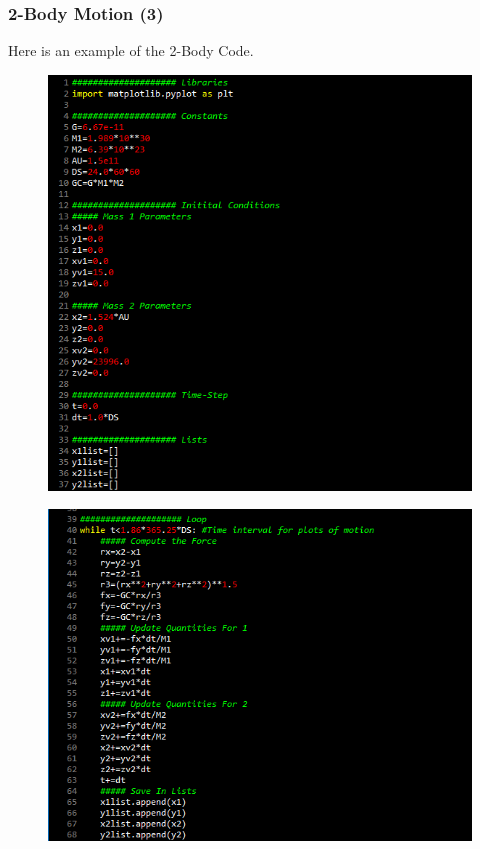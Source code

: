\documentclass{beamer}
\begin{document}
\begin{frame}
\frametitle{2-Body Motion (3)}
Here is an example of the 2-Body Code.
\begin{multicols}{2}
\begin{figure}
\begin{center}
\includegraphics[width=1.0\linewidth]{2BodyCode1.png}
\end{center}
\end{figure}
\begin{figure}
\begin{center}
\includegraphics[width=1.0\linewidth]{2BodyCode2.png}
\end{center}
\end{figure}
\end{multicols}
\end{frame}
\end{document}

